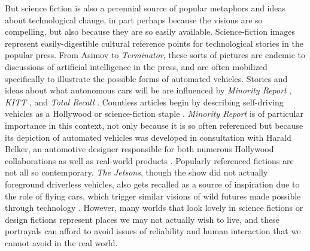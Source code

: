 But science fiction is also a perennial source of popular metaphors and ideas
about technological change, in part perhaps because the visions are so
compelling, but also because they are so easily available. 
Science-fiction images represent easily-digestible
cultural reference 
points for technological stories in the popular press. From Asimov to
\emph{Terminator}, 
these sorts of pictures are endemic to discussions of artificial
intelligence in the press, and are often mobilized specifically to
illustrate the possible forms of automated vehicles. Stories and ideas
about what autonomous cars will be are
influenced by \emph{Minority Report} \cite{fromHollywood}, \emph{KITT}
\cite{wadeKITT}, and \emph{Total
  Recall} \cite{pasdirtzSolution}. Countless articles begin by describing
self-driving vehicles as a Hollywood or science-fiction
staple \cite{scifiToReality}. \emph{Minority Report} is of particular
importance in this context, not only because it is so often referenced
but because its depiction of automated vehicles was developed in
consultation with Harald Belker, an automotive designer responsible
for both numerous Hollywood collaborations as well as real-world
products \cite{melansonMinority}. Popularly referenced fictions are
not all so contemporary. \emph{The Jetsons}, though
the show did not actually foreground driverless vehicles, also gets
recalled as a source of inspiration due to the role of flying cars,
which trigger similar visions of wild 
futures made possible through technology \cite{JetsonsAge}. However, many
worlds that look lovely in science fictions or design fictions represent places 
we may not actually wish to live, and these portrayals can afford to
avoid issues of reliability and human interaction that we cannot avoid
in the real world. 




